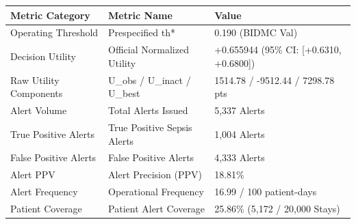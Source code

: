 \begin{tabular}{lll}
\toprule
Metric Category & Metric Name & Value \\
\midrule
Operating Threshold & Prespecified th* & 0.190 (BIDMC Val) \\
Decision Utility & Official Normalized Utility & +0.655944 (95\% CI: [+0.6310, +0.6800]) \\
Raw Utility Components & U\_obs / U\_inact / U\_best & 1514.78 / -9512.44 / 7298.78 pts \\
Alert Volume & Total Alerts Issued & 5,337 Alerts \\
True Positive Alerts & True Positive Sepsis Alerts & 1,004 Alerts \\
False Positive Alerts & False Positive Alerts & 4,333 Alerts \\
Alert PPV & Alert Precision (PPV) & 18.81\% \\
Alert Frequency & Operational Frequency & 16.99 / 100 patient-days \\
Patient Coverage & Patient Alert Coverage & 25.86\% (5,172 / 20,000 Stays) \\
\bottomrule
\end{tabular}
